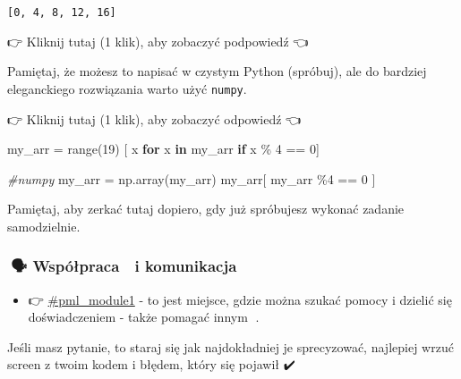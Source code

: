 \documentclass[11pt]{article}
\makeatletter
\providecommand{\tightlist}{%
      \setlength{\itemsep}{0pt}\setlength{\parskip}{0pt}}
\newenvironment{Shaded}{}{}
\newcommand{\KeywordTok}[1]{\textcolor[rgb]{0.00,0.44,0.13}{\textbf{{#1}}}}
\newcommand{\DecValTok}[1]{\textcolor[rgb]{0.25,0.63,0.44}{{#1}}}
\newcommand{\CommentTok}[1]{\textcolor[rgb]{0.38,0.63,0.69}{\textit{{#1}}}}
\newcommand{\NormalTok}[1]{{#1}}
\newcommand{\ControlFlowTok}[1]{\textcolor[rgb]{0.00,0.44,0.13}{\textbf{{#1}}}}
\newcommand{\OperatorTok}[1]{\textcolor[rgb]{0.40,0.40,0.40}{{#1}}}
\newcommand{\BuiltInTok}[1]{{#1}}
\newcommand{\boxspacing}{\kern\kvtcb@left@rule\kern\kvtcb@boxsep}
\newcommand{\prompt}[4]{
        \ttfamily\llap{{\color{#2}[#3]:\hspace{3pt}#4}}\vspace{-\baselineskip}
    }
\makeatother
\begin{document}
            \begin{tcolorbox}[breakable, size=fbox, boxrule=.5pt, pad at break*=1mm, opacityfill=0]
\prompt{Out}{outcolor}{21}{\boxspacing}
\begin{Verbatim}[commandchars=\\\{\}]
[0, 4, 8, 12, 16]
\end{Verbatim}
\end{tcolorbox}
        
    👉 Kliknij tutaj (1 klik), aby zobaczyć podpowiedź 👈

Pamiętaj, że możesz to napisać w czystym Python (spróbuj), ale do
bardziej eleganckiego rozwiązania warto użyć \texttt{numpy}.

👉 Kliknij tutaj (1 klik), aby zobaczyć odpowiedź 👈

\begin{Shaded}
\begin{Highlighting}[]
\NormalTok{my\_arr }\OperatorTok{=} \BuiltInTok{range}\NormalTok{(}\DecValTok{19}\NormalTok{)}
\NormalTok{[ x }\ControlFlowTok{for}\NormalTok{ x }\KeywordTok{in}\NormalTok{ my\_arr }\ControlFlowTok{if}\NormalTok{ x }\OperatorTok{\%} \DecValTok{4} \OperatorTok{==} \DecValTok{0}\NormalTok{]}
    
\CommentTok{\#numpy}
\NormalTok{my\_arr }\OperatorTok{=}\NormalTok{ np.array(my\_arr)}
\NormalTok{my\_arr[ my\_arr }\OperatorTok{\%}\DecValTok{4} \OperatorTok{==} \DecValTok{0}\NormalTok{ ]}
\end{Highlighting}
\end{Shaded}

Pamiętaj, aby zerkać tutaj dopiero, gdy już spróbujesz wykonać zadanie
samodzielnie.

    \hypertarget{wspuxf3ux142praca-i-komunikacja}{%
\subsubsection{🤝🗣️ Współpraca 💪 i komunikacja
💬}\label{wspuxf3ux142praca-i-komunikacja}}

\begin{itemize}
\tightlist
\item
  👉
  \href{https://practicalmlcourse.slack.com/archives/C045CNLNH89}{\#pml\_module1}
  - to jest miejsce, gdzie można szukać pomocy i dzielić się
  doświadczeniem - także pomagać innym 🥰.
\end{itemize}

Jeśli masz pytanie, to staraj się jak najdokładniej je sprecyzować,
najlepiej wrzuć screen z twoim kodem i błędem, który się pojawił ✔️
\end{document}
